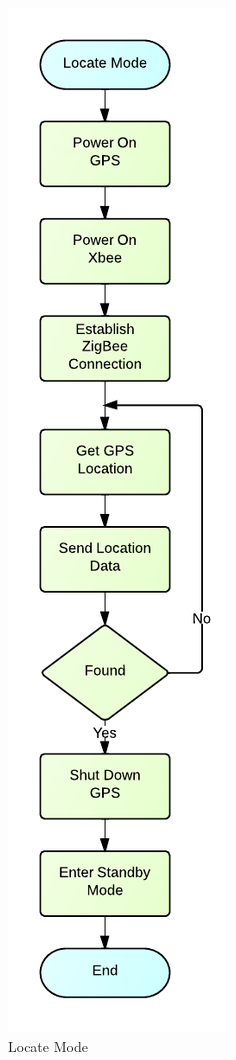 \begin{figure}[H]
	\centering
	\includegraphics[scale=1.0]{img/LocateMode.pdf}
	\caption{Locate Mode \label{fig:locateMode}}
\end{figure}

